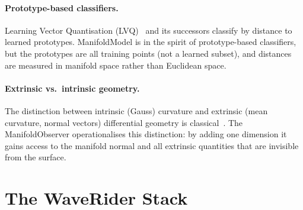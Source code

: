 \documentclass[12pt,letterpaper]{article}
\begin{document}
\paragraph{Prototype-based classifiers.}
Learning Vector Quantisation (LVQ)~\cite{kohonen90} and its successors classify
by distance to learned prototypes.  ManifoldModel is in the spirit of
prototype-based classifiers, but the prototypes are all training points (not a
learned subset), and distances are measured in manifold space rather than
Euclidean space.

\paragraph{Extrinsic vs.\ intrinsic geometry.}
The distinction between intrinsic (Gauss) curvature and extrinsic (mean
curvature, normal vectors) differential geometry is classical~\cite{docarmo76}.
The ManifoldObserver operationalises this distinction: by adding one dimension it
gains access to the manifold normal and all extrinsic quantities that are
invisible from the surface.

\section{The WaveRider Stack}
\end{document}
